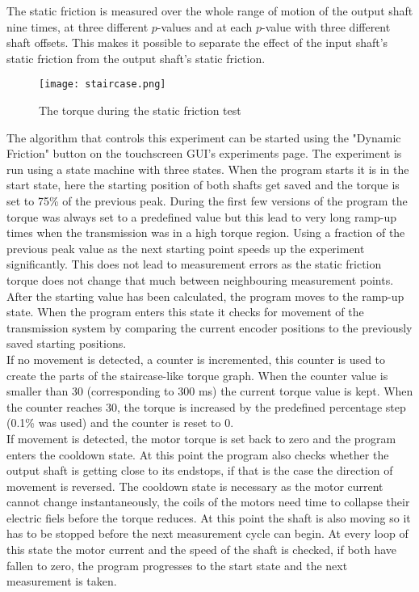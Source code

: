 \documentclass[12pt]{article}
\begin{document}
The static friction is measured over the whole range of motion of the output shaft nine times, at three different $p$-values and at each $p$-value with three different shaft offsets. This makes it possible to separate the effect of the input shaft's static friction from the output shaft's static friction.

\begin{figure}[h]
    \centering
    \texttt{[image: staircase.png]}
    \caption{The torque during the static friction test}
    \label{fig:staticFricTorqueTime}
\end{figure}

The algorithm that controls this experiment can be started using the "Dynamic Friction" button on the touchscreen GUI's experiments page. The experiment is run using a state machine with three states. When the program starts it is in the start state, here the starting position of both shafts get saved and the torque is set to 75\% of the previous peak. During the first few versions of the program the torque was always set to a predefined value but this lead to very long ramp-up times when the transmission was in a high torque region. Using a fraction of the previous peak value as the next starting point speeds up the experiment significantly. This does not lead to measurement errors as the static friction torque does not change that much between neighbouring measurement points. \\

After the starting value has been calculated, the program moves to the ramp-up state. When the program enters this state it checks for movement of the transmission system by comparing the current encoder positions to the previously saved starting positions.  \\

If no movement is detected, a counter is incremented, this counter is used to create the parts of the staircase-like torque graph. When the counter value is smaller than 30 (corresponding to 300 ms) the current torque value is kept. When the counter reaches 30, the torque is increased by the predefined percentage step (0.1\% was used) and the counter is reset to 0.\\

If movement is detected, the motor torque is set back to zero and the program enters the cooldown state. At this point the program also checks whether the output shaft is getting close to its endstops, if that is the case the direction of movement is reversed.
The cooldown state is necessary as the motor current cannot change instantaneously, the coils of the motors need time to collapse their electric fiels before the torque reduces. At this point the shaft is also moving so it has to be stopped before the next measurement cycle can begin. At every loop of this state the motor current and the speed of the shaft is checked, if both have fallen to zero, the program progresses to the start state and the next measurement is taken.
\end{document}
